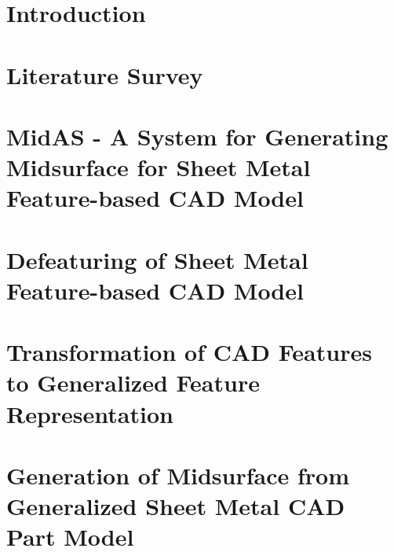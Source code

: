 \chapter{Introduction} \label{ch:Introduction}


\chapter{Literature Survey} \label{ch:Survey}


\chapter{MidAS - A System for Generating Midsurface for Sheet Metal Feature-based CAD Model}  \label{ch:Proposal}


\chapter{Defeaturing of Sheet Metal Feature-based CAD Model} \label{ch:Defeaturing}





\chapter{Transformation of CAD Features to Generalized Feature Representation} \label{ch:Abstraction}





\chapter{Generation of Midsurface from Generalized Sheet Metal CAD Part Model} \label{ch:Midsurface}





